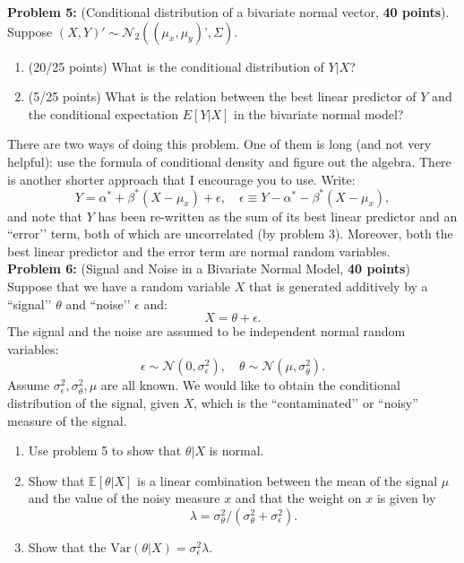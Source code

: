 \documentclass[11pt]{article} %
\begin{document}
\noindent \textbf{Problem 5:} (Conditional distribution of a bivariate normal vector, \textbf{40 points}). Suppose $(X,Y)' \sim \mathcal{N}_2((\mu_x, \mu_y)’, \Sigma)$. 

\begin{enumerate}
\item (20/25 points) What is the conditional distribution of $Y | X$?
\item (5/25 points) What is the relation between the best linear predictor of $Y$ and the conditional expectation $E[Y|X]$ in the bivariate normal model? 
\end{enumerate}
 There are two ways of doing this problem. One of them is long (and not very helpful): use the formula of conditional density and figure out the algebra. There is another shorter approach that I encourage you to use. Write:
\[  Y = \alpha^* + \beta^*(X-\mu_x) + \epsilon, \quad \epsilon \equiv Y - \alpha^*-\beta^*(X-\mu_x), \]
and note that $Y$ has been re-written as the sum of its best linear predictor and an ``error’’ term, both of which are uncorrelated (by problem 3). Moreover, both the best linear predictor and the error term are normal random variables. \\

\noindent \textbf{Problem 6:} (Signal and Noise in a Bivariate Normal Model, \textbf{40 points}) Suppose that we have a random variable $X$ that is generated additively by  a ``signal’’ $\theta$ and ``noise’’ $\epsilon$ and:
\[X = \theta + \epsilon.\]
The signal and the noise are assumed to be independent normal random variables:
\[ \epsilon \sim \mathcal{N}(0, \sigma^2_{\epsilon}), \quad \theta \sim \mathcal{N}(\mu, \sigma^2_{\theta}). \]
Assume $\sigma^2_{\epsilon}, \sigma^2_{\theta}, \mu$ are all known. We would like to obtain the conditional distribution of the signal, given $X$, which is the ``contaminated’’ or ``noisy” measure of the signal. 
\begin{enumerate}
\item Use problem 5 to show that $\theta | X$ is normal. \\
\item Show that $\mathbb{E}[\theta | X]$ is a linear combination between the mean of the signal $\mu$ and the value of the noisy measure $x$ and that the weight on $x$ is given by
\[\lambda = \sigma^2_{\theta} / (\sigma^2_{\theta} + \sigma^2_{\epsilon}).\]
\item Show that the $\textrm{Var}(\theta | X) = \sigma^2_{\epsilon} \lambda.$
\end{enumerate}









\end{document}
